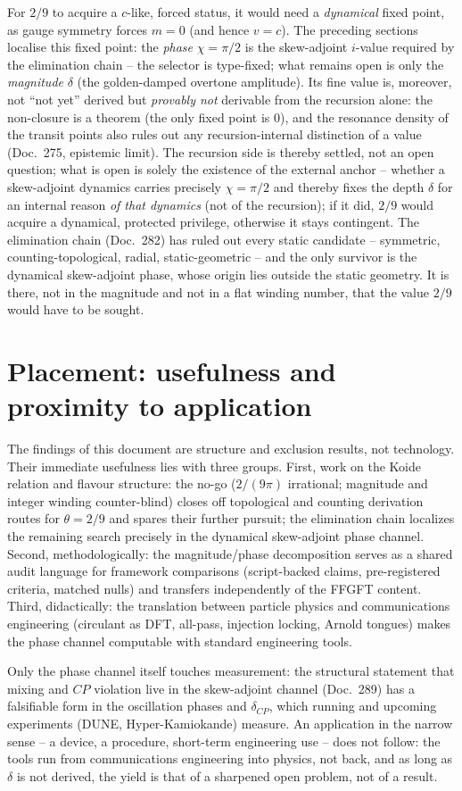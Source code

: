 For $2/9$ to acquire a $c$-like, forced status, it would need a \emph{dynamical} fixed point,
as gauge symmetry forces $m=0$ (and hence $v=c$). The preceding sections localise this fixed
point: the \emph{phase} $\chi=\pi/2$ is the skew-adjoint $i$-value required by the elimination
chain -- the selector is type-fixed; what remains open is only the \emph{magnitude} $\delta$
(the golden-damped overtone amplitude). Its fine value is, moreover, not \enquote{not yet}
derived but \emph{provably not} derivable from the recursion alone: the non-closure is a theorem
(the only fixed point is $0$), and the resonance density of the transit points also rules out
any recursion-internal distinction of a value (Doc.~275, epistemic limit). The recursion side is
thereby settled, not an open question; what is open is solely the existence of the external
anchor -- whether a skew-adjoint dynamics carries precisely $\chi=\pi/2$ and thereby fixes the
depth $\delta$ for an internal reason \emph{of that dynamics} (not of the recursion); if it did,
$2/9$ would acquire a dynamical,
protected privilege, otherwise it stays contingent. The elimination chain (Doc.~282) has ruled
out every static candidate -- symmetric, counting-topological, radial, static-geometric -- and
the only survivor is the dynamical skew-adjoint phase, whose origin lies outside the static
geometry. It is there, not in the magnitude and not in a flat winding number, that the value
$2/9$ would have to be sought.

\section{Placement: usefulness and proximity to application}
The findings of this document are structure and exclusion results, not technology. Their
immediate usefulness lies with three groups. First, work on the Koide relation and flavour
structure: the no-go ($2/(9\pi)$ irrational; magnitude and integer winding counter-blind)
closes off topological and counting derivation routes for $\theta=2/9$ and spares their further
pursuit; the elimination chain localizes the remaining search precisely in the dynamical
skew-adjoint phase channel. Second, methodologically: the magnitude/phase decomposition serves
as a shared audit language for framework comparisons (script-backed claims, pre-registered
criteria, matched nulls) and transfers independently of the FFGFT content. Third, didactically:
the translation between particle physics and communications engineering (circulant as DFT,
all-pass, injection locking, Arnold tongues) makes the phase channel computable with standard
engineering tools.

Only the phase channel itself touches measurement: the structural statement that mixing and
$CP$ violation live in the skew-adjoint channel (Doc.~289) has a falsifiable form in the
oscillation phases and $\delta_{CP}$, which running and upcoming experiments (DUNE,
Hyper-Kamiokande) measure. An application in the narrow sense -- a device, a procedure,
short-term engineering use -- does not follow: the tools run from communications engineering
into physics, not back, and as long as $\delta$ is not derived, the yield is that of a
sharpened open problem, not of a result.
